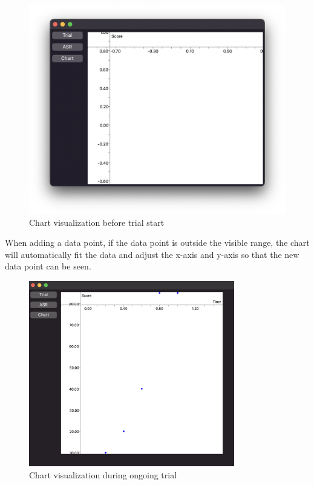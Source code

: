 \begin{figure}
    \centering
    \includegraphics[width=\textwidth]{figures/chart_start}
    \caption{Chart visualization before trial start}
    \label{fig:chart_start}
\end{figure}

When adding a data point, if the data point is outside the visible range, the
chart will automatically fit the data and adjust the x-axis and y-axis so that
the new data point can be seen.

\begin{figure}
    \centering
    \includegraphics[width=0.8\textwidth]{figures/chart_realtime}
    \caption{Chart visualization during ongoing trial}
    \label{fig:chart_ongoing}
\end{figure}
